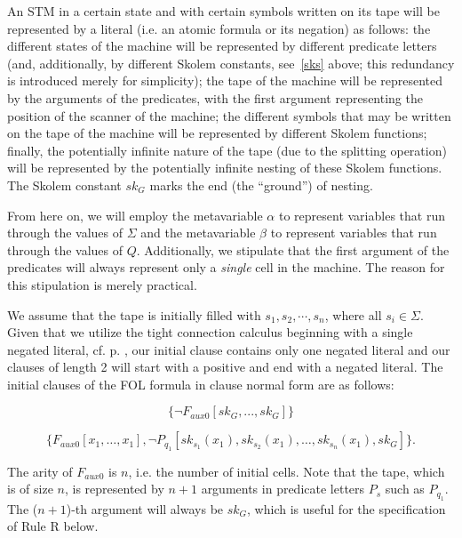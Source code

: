 \documentclass[%
  manuscript=article,   %
  year=2024,
  volume=77,
  doi=00000.000,
]{zfn}
\begin{document}
An STM in a certain state and with certain symbols written on its tape will be represented by a literal (i.e. an atomic formula or its negation) as follows: the different states of the machine will be represented by different predicate letters (and, additionally, by different Skolem constants, see~\ref{sks} above; this redundancy is introduced merely for simplicity); the tape of the machine will be represented by the arguments of the predicates, with the first argument representing the position of the scanner of the machine; the different symbols that may be written on the tape of the machine will be represented by different Skolem functions; finally, the potentially infinite nature of the tape (due to the splitting operation) will be represented by the potentially infinite nesting of these Skolem functions. The Skolem constant $sk_G$ marks the end (the ``ground'') of nesting.

From here on, we will employ the metavariable $\alpha$ to represent variables that run through the values of $\Sigma$ and the metavariable $\beta$ to represent variables that run through the values of $Q$. Additionally, we stipulate that the first argument of the predicates will always represent only a \textit{single} cell in the machine. The reason for this stipulation is merely practical.

We assume that the tape is initially filled with $s_1, s_2,\cdots, s_n$, where all $s_i\in\Sigma$. 
Given that we utilize the tight connection calculus beginning with a single negated literal, cf. p. \pageref{onenegative}, our initial clause contains only one negated literal and our clauses of length 2 will start with a positive and end with a negated literal.
The initial clauses of the FOL formula in clause normal form are as follows:

\begin{equation}
\{\neg F_{aux0}[sk_G, ..., sk_G]\} \label{ini1}
\end{equation}

\begin{equation}
\{F_{aux0}[x_1, \ldots, x_1], \neg P_{q_1}[sk_{s_1}(x_1), sk_{s_2}(x_1), \ldots, sk_{s_n}(x_1), sk_G]\}. \label{ini2}
\end{equation}

The arity of $F_{aux0}$ is $n$, i.e. the number of initial cells.
Note that the tape, which is of size $n$, is represented by $n+1$ arguments in predicate letters $P_s$ such as $P_{q_1}$.
The ($n+1$)-th argument will always be $sk_G$, which is useful for the specification of Rule R below.
\end{document}
